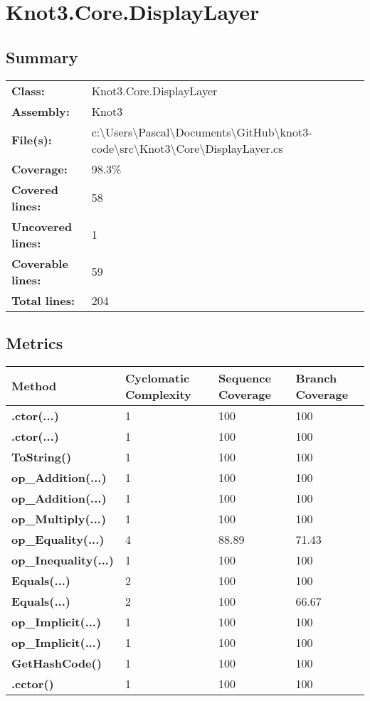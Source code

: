 \documentclass[a4paper,10pt]{article}
\begin{document}
\section{Knot3.Core.DisplayLayer}
\subsection{Summary}
\begin{longtable}[l]{ll}
\textbf{Class:} & Knot3.Core.DisplayLayer\\
\textbf{Assembly:} & Knot3\\
\textbf{File(s):} & \begin{minipage}[t]{12cm}{c:\textbackslash Users\textbackslash Pascal\textbackslash Documents\textbackslash GitHub\textbackslash knot3-code\textbackslash src\textbackslash Knot3\textbackslash Core\textbackslash DisplayLayer.cs}\end{minipage} \\
\textbf{Coverage:} & 98.3\%\\
\textbf{Covered lines:} & 58\\
\textbf{Uncovered lines:} & 1\\
\textbf{Coverable lines:} & 59\\
\textbf{Total lines:} & 204\\
\end{longtable}
\subsection{Metrics}
\begin{longtable}[l]{|l|l|l|l|}
\hline
\textbf{Method} & \textbf{Cyclomatic Complexity} & \textbf{Sequence Coverage} & \textbf{Branch Coverage}\\
\hline
\textbf{.ctor(...)} & 1 & 100 & 100\\
\hline
\textbf{.ctor(...)} & 1 & 100 & 100\\
\hline
\textbf{ToString()} & 1 & 100 & 100\\
\hline
\textbf{op\_Addition(...)} & 1 & 100 & 100\\
\hline
\textbf{op\_Addition(...)} & 1 & 100 & 100\\
\hline
\textbf{op\_Multiply(...)} & 1 & 100 & 100\\
\hline
\textbf{op\_Equality(...)} & 4 & 88.89 & 71.43\\
\hline
\textbf{op\_Inequality(...)} & 1 & 100 & 100\\
\hline
\textbf{Equals(...)} & 2 & 100 & 100\\
\hline
\textbf{Equals(...)} & 2 & 100 & 66.67\\
\hline
\textbf{op\_Implicit(...)} & 1 & 100 & 100\\
\hline
\textbf{op\_Implicit(...)} & 1 & 100 & 100\\
\hline
\textbf{GetHashCode()} & 1 & 100 & 100\\
\hline
\textbf{.cctor()} & 1 & 100 & 100\\
\hline
\end{longtable}
\end{document}
